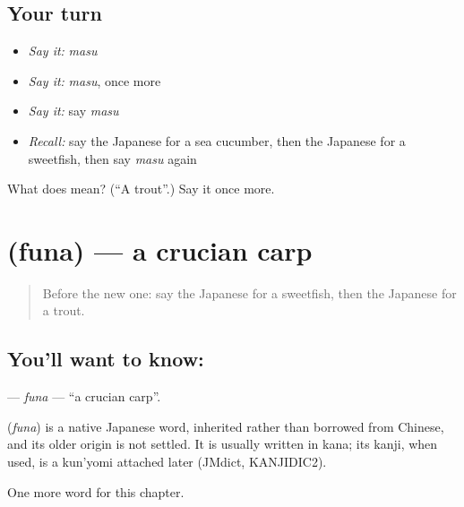 \subsection*{Your turn}
\begin{itemize}
\raggedright
  \item \emph{Say it:} \emph{masu}
  \item \emph{Say it:} \emph{masu}, once more
  \item \emph{Say it:} say \emph{masu}
  \item \emph{Recall:} say the Japanese for a sea cucumber, then the Japanese for a sweetfish, then say \emph{masu} again
\end{itemize}

\begin{tcolorbox}[breakable,colback=teal!4,colframe=teal!35!black,title={Before you move on}]
What does  mean? (\textquotedblleft{}A trout\textquotedblright{}.) Say it once more.
\end{tcolorbox}
\section[\texorpdfstring{\ja{ふな} (funa)}{ふな (funa)}]{ (funa) — a crucian carp}

\label{lesson:JA-C116-funa}



\begin{quote}
Before the new one: say the Japanese for a sweetfish, then the Japanese for a trout.
\end{quote}

\subsection*{You'll want to know: }
\textbf{} — \emph{funa} — \textquotedblleft{}a crucian carp\textquotedblright{}.

\begin{cousinweb}
\textbf{} (\emph{funa}) is a native Japanese word, inherited rather than borrowed from Chinese, and its older origin is not settled. It is usually written in kana; its kanji, when used, is a kun'yomi attached later (JMdict, KANJIDIC2).
\end{cousinweb}

\begin{grammarlens}[title={What you've built}]
One more word for this chapter.
\end{grammarlens}

